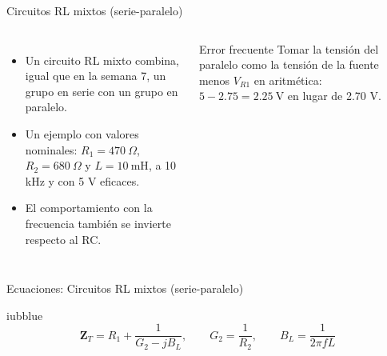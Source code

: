 \documentclass[aspectratio=169,11pt,xcolor={table}]{beamer}
\begin{document}
\begin{frame}{Circuitos RL mixtos (serie-paralelo)}
\begin{columns}[c,onlytextwidth]
\small
\begin{itemize}\setlength{\itemsep}{4pt}
  \item Un circuito RL mixto combina, igual que en la semana 7, un grupo en serie con un grupo en paralelo.
  \item Un ejemplo con valores nominales: $R_1 = 470\ \Omega$, $R_2 = 680\ \Omega$ y $L = 10\ \text{mH}$, a 10 kHz y con 5 V eficaces.
  \item El comportamiento con la frecuencia también se invierte respecto al RC.
\end{itemize}
\begin{cardO}{Error frecuente}
\footnotesize Tomar la tensión del paralelo como la tensión de la fuente menos $V_{R1}$ en aritmética: $5 - 2.75 = 2.25\ \text{V}$ en lugar de 2.70 V.
\end{cardO}
\end{columns}
\end{frame}

\begin{frame}{Ecuaciones: Circuitos RL mixtos (serie-paralelo)}
\begin{cajaplana}{iubblue}
\centering
{\large
\begin{equation*}
  \mathbf{Z}_T = R_1 + \frac{1}{G_2 - jB_L}, \qquad G_2 = \frac{1}{R_2}, \qquad B_L = \frac{1}{2\pi f L}
\end{equation*}
}
\end{cajaplana}
\end{frame}
\end{document}
